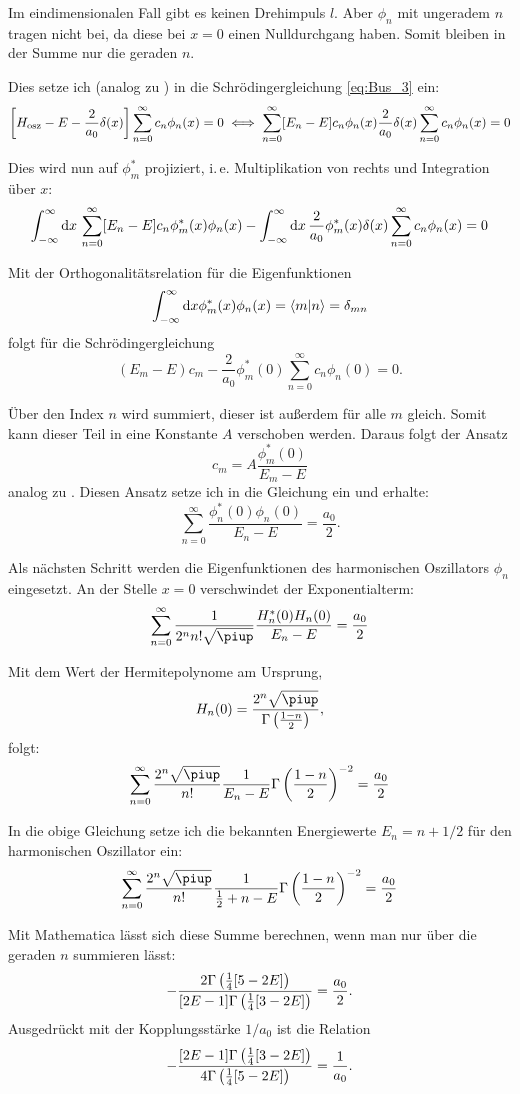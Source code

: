 Im eindimensionalen Fall gibt es keinen Drehimpuls $l$. Aber $\phi_n$ mit
ungeradem $n$ tragen nicht bei, da diese bei $x = 0$ einen Nulldurchgang haben.
Somit bleiben in der Summe nur die geraden $n$.

Dies setze ich (analog zu ) in die Schrödingergleichung \eqref{eq:Bus_3}
ein:
\[
    \sbr{H_\text{osz} - E - \frac2{a_0} \delta(x)}
    \sum_{n=0}^\infty c_n \phi_n(x)
    = 0
    \iff
    \sum_{n=0}^\infty [E_n - E] c_n \phi_n(x)
    \frac2{a_0} \delta(x)
    \sum_{n=0}^\infty c_n \phi_n(x)
    = 0
\]

Dies wird nun auf $\phi_m^*$ projiziert, i.\,e. Multiplikation von rechts und
Integration über $x$:
\[
    \int_{-\infty}^\infty \dif x \, \sum_{n=0}^\infty
    [E_n - E] c_n \phi_m^*(x) \phi_n(x)
    -
    \int_{-\infty}^\infty \dif x \,  \frac2{a_0} \phi_m^*(x) \delta(x)
    \sum_{n=0}^\infty c_n \phi_n(x) = 0
\]

Mit der Orthogonalitätsrelation für die Eigenfunktionen
\[
    \int_{-\infty}^\infty \dif x \phi_m^*(x) \phi_n(x) = \braket{m|n} =
    \delta_{mn}
\]
folgt für die Schrödingergleichung
\[
    (E_m - E) c_m - \frac2{a_0} \phi_m^*(0) \sum_{n=0}^\infty c_n \phi_n(0) =
    0.
\]

Über den Index $n$ wird summiert, dieser ist außerdem für alle $m$ gleich.
Somit kann dieser Teil in eine Konstante $A$ verschoben werden. Daraus folgt
der Ansatz
\[
    c_m = A \frac{\phi_m^*(0)}{E_m - E}
\]
analog zu . Diesen Ansatz setze ich in die Gleichung ein und erhalte:
\[
    \sum_{n=0}^\infty \frac{\phi_n^*(0) \phi_n(0)}{E_n - E} = \frac{a_0}2.
\]

Als nächsten Schritt werden die Eigenfunktionen des harmonischen Oszillators
$\phi_n$ eingesetzt. An der Stelle $x = 0$ verschwindet der Exponentialterm:
\[
    \sum_{n=0}^\infty \frac{1}{2^n n! \sqrt\piup} \frac{H_n^*(0) H_n(0)}{E_n -
    E} = \frac{a_0}2
\]

Mit dem Wert der Hermitepolynome am Ursprung,
\[
    H_n(0) = \frac{2^n \sqrt\piup}{\Gamma\del{\frac{1-n}2}},
\]
folgt:
\[
    \sum_{n=0}^\infty \frac{2^n \sqrt\piup}{n!} \frac{1}{E_n -
    E} \Gamma\del{\frac{1-n}2}^{-2} = \frac{a_0}2
\]

In die obige Gleichung setze ich die bekannten Energiewerte $E_n = n + 1/2$ für
den harmonischen Oszillator ein:
\[
    \sum_{n=0}^\infty \frac{2^n \sqrt\piup}{n!} \frac{1}{\frac 12 + n -
    E} \Gamma\del{\frac{1-n}2}^{-2} = \frac{a_0}2
\]

Mit Mathematica lässt sich diese Summe berechnen, wenn man nur über die geraden
$n$ summieren lässt:
\[
    - \frac{2 \Gamma\del{\frac 14[5-2E]}}{[2E-1]\Gamma\del{\frac 14[3-2E]}}
    = \frac{a_0}2.
\]
Ausgedrückt mit der Kopplungsstärke $1/a_0$ ist die Relation
\begin{equation}
    \label{eq:Energie-Delta}
    - \frac{[2E-1]\Gamma\del{\frac 14[3-2E]}}{4 \Gamma\del{\frac 14[5-2E]}}
    = \frac1{a_0}.
\end{equation}

